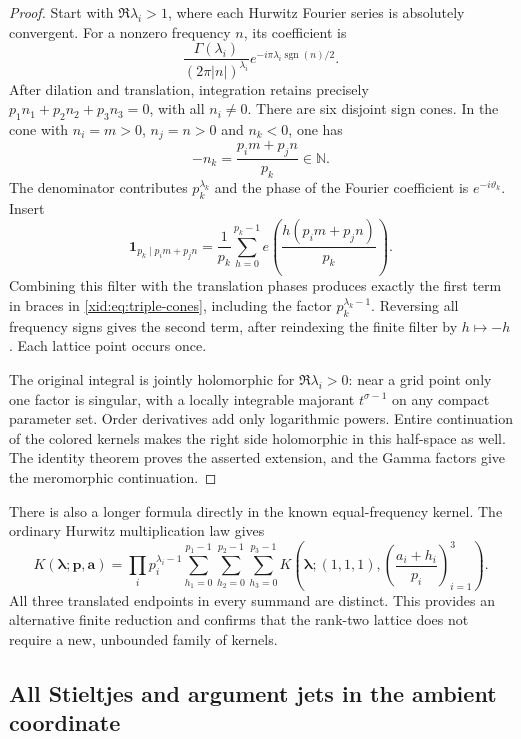 \documentclass[11pt,a4paper]{article}
\numberwithin{equation}{section}
\theoremstyle{definition}
\theoremstyle{remark}
\begin{document}
\begin{proof}
Start with $\Re\lambda_i>1$, where each Hurwitz Fourier series is
absolutely convergent.  For a nonzero frequency $n$, its coefficient
is
\[
 \frac{\Gamma(\lambda_i)}{(2\pi|n|)^{\lambda_i}}
      e^{-i\pi\lambda_i\operatorname{sgn}(n)/2}.
\]
After dilation and translation, integration retains precisely
$p_1n_1+p_2n_2+p_3n_3=0$, with all $n_i\ne0$.
There are six disjoint sign cones.  In the cone with $n_i=m>0$,
$n_j=n>0$ and $n_k<0$, one has
\[
 -n_k=\frac{p_i m+p_j n}{p_k}\in\mathbb N.
\]
The denominator contributes $p_k^{\lambda_k}$ and the phase of
the Fourier coefficient is $e^{-i\vartheta_k}$.  Insert
\[
 \mathbf1_{p_k\mid p_i m+p_j n}
   =\frac1{p_k}\sum_{h=0}^{p_k-1}
                  e\left(\frac{h(p_i m+p_j n)}{p_k}\right).
\]
Combining this filter with the translation phases produces exactly
the first term in braces in \eqref{xid:eq:triple-cones}, including the
factor $p_k^{\lambda_k-1}$.  Reversing all frequency signs gives
the second term, after reindexing the finite filter by $h\mapsto-h$.
Each lattice point occurs once.

The original integral is jointly holomorphic for $\Re\lambda_i>0$:
near a grid point only one factor is singular, with a locally
integrable majorant $t^{\sigma-1}$ on any compact parameter set.
Order derivatives add only logarithmic powers.  Entire continuation
of the colored kernels makes the right side holomorphic in this
half-space as well.  The identity theorem proves the asserted
extension, and the Gamma factors give the meromorphic continuation.
\end{proof}

There is also a longer formula directly in the known equal-frequency
kernel.  The ordinary Hurwitz multiplication law gives
\begin{equation}\label{xid:eq:covering-triple}
 K(\boldsymbol\lambda;\boldsymbol p,\boldsymbol a)
 =\prod_i p_i^{\lambda_i-1}
 \sum_{h_1=0}^{p_1-1}\sum_{h_2=0}^{p_2-1}\sum_{h_3=0}^{p_3-1}
 K\left(\boldsymbol\lambda;(1,1,1),
        \left(\frac{a_i+h_i}{p_i}\right)_{i=1}^3\right).
\end{equation}
All three translated endpoints in every summand are distinct.  This
provides an alternative finite reduction and confirms that the rank-two
lattice does not require a new, unbounded family of kernels.

\subsection{All Stieltjes and argument jets in the ambient coordinate}
\end{document}
